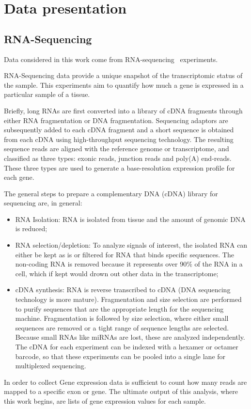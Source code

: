 \chapter{Data presentation}\label{ch:data}
\section{RNA-Sequencing}\label{sec:rnaseq}
Data considered in this work come from RNA-sequencing~\cite{wang2009rna} experiments.
 
RNA-Sequencing data provide a unique snapshot of the transcriptomic status of the sample. This experiments aim to quantify how much a gene is expressed in a particular sample of a tissue.

Briefly, long RNAs are first converted into a library of cDNA fragments through either RNA fragmentation or DNA fragmentation. Sequencing adaptors are subsequently added to each cDNA fragment and a short sequence is obtained from each cDNA using high-throughput sequencing technology. The resulting sequence reads are aligned with the reference genome or transcriptome, and classified as three types: exonic reads, junction reads and poly(A) end-reads. These three types are used to generate a base-resolution expression profile for each gene.

The general steps to prepare a complementary DNA (cDNA) library for sequencing are, in general:
\begin{itemize}
\item RNA Isolation: RNA is isolated from tissue and the amount of genomic DNA is reduced;
\item RNA selection/depletion: To analyze signals of interest, the isolated RNA can either be kept as is or filtered for RNA that binds specific sequences. The non-coding RNA is removed because it represents over 90$\%$ of the RNA in a cell, which if kept would drown out other data in the transcriptome;
\item cDNA synthesis: RNA is reverse transcribed to cDNA (DNA sequencing technology is more mature). Fragmentation and size selection are performed to purify sequences that are the appropriate length for the sequencing machine.  Fragmentation is followed by size selection, where either small sequences are removed or a tight range of sequence lengths are selected. Because small RNAs like miRNAs are lost, these are analyzed independently. The cDNA for each experiment can be indexed with a hexamer or octamer barcode, so that these experiments can be pooled into a single lane for multiplexed sequencing.
\end{itemize}
In order to collect Gene expression data is sufficient to count how many reads are mapped to a specific exon or gene. The ultimate output of this analysis, where this work begins, are lists of gene expression values for each sample.
